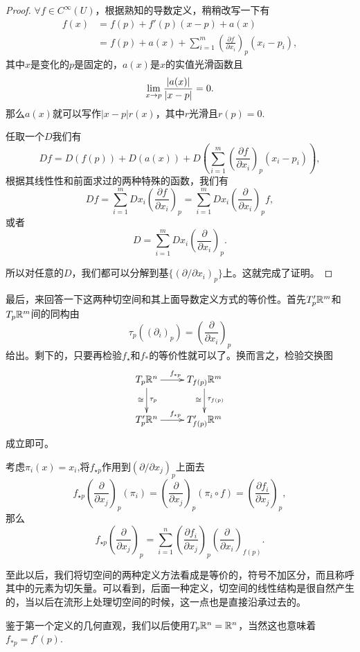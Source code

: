 \documentclass[11pt]{extbook}
\theoremstyle{plain}%
\begin{document}
\begin{proof}
	$\forall f\in C^\infty(U)$，根据熟知的导数定义，稍稍改写一下有
	\[
		\begin{split}
			f(x)&=f(p)+f'(p)(x-p)+a(x)\\
			&=f(p)+a(x)+\sum_{i=1}^m \left(\frac{\partial f}{\partial x_i}\right)_p(x_i-p_i),
		\end{split}
	\]
	其中$x$是变化的$p$是固定的，$a(x)$是$x$的实值光滑函数且
	\[
		\lim_{x\to p}\frac{\arrowvert a(x)\arrowvert }{\arrowvert x-p\arrowvert }=0.
	\]
	那么$a(x)$就可以写作$|x-p|r(x)$，其中$r$光滑且$r(p)=0$.

	任取一个$D$我们有
	\[
		Df=D\left(f(p)\right)+D\left(a(x)\right)+D\left(\sum_{i=1}^m \left(\frac{\partial f}{\partial x_i}\right)_p(x_i-p_i)\right),
	\]
	根据其线性性和前面求过的两种特殊的函数，我们有
	\[
		Df=\sum_{i=1}^m Dx_i\left(\frac{\partial f}{\partial x_i}\right)_p=\sum_{i=1}^m Dx_i\left(\frac{\partial }{\partial x_i}\right)_pf,
	\]
	或者
	\[
		D=\sum_{i=1}^m Dx_i\left(\frac{\partial }{\partial x_i}\right)_p.
	\]
	
	所以对任意的$D$，我们都可以分解到基$\{\left(\partial/\partial x_i\right)_p\}$上。这就完成了证明。
\end{proof}

最后，来回答一下这两种切空间和其上面导数定义方式的等价性。首先$T'_p\mathbb{R}^m$和$T_p\mathbb{R}^m$间的同构由
\[
	\tau_p\left((\partial_i)_p\right)=\left(\frac{\partial }{\partial x_i}\right)_p
\]
给出。剩下的，只要再检验$f_\star$和$f_*$的等价性就可以了。换而言之，检验交换图
\[
	\xymatrix{
	T_{p}\rr^n\ar[d]_\cong^{\tau_p}\ar[r]^{f_{*p}}&T_{f(p)}\rr^m\ar[d]_\cong^{\tau_{f(p)}}\\
	T'_{p}\rr^n\ar[r]^{f_{\star p}}&T'_{f(p)}\rr^m
	}
\]
成立即可。

考虑$\pi_i(x)=x_i$,将$f_{\star p}$作用到$\left(\partial/\partial x_j\right)_p$上面去
\[
	f_{\star p}\left(\frac{\partial}{\partial x_j}\right)_p(\pi_i)=\left(\frac{\partial}{\partial x_j}\right)_p(\pi_i\circ f)=\left(\frac{\partial f_i}{\partial x_j}\right)_p,
\]
那么
\[
	f_{\star p}\left(\frac{\partial}{\partial x_j}\right)_p=\sum_{i=1}^n\left(\frac{\partial f_i}{\partial x_j}\right)_p \left(\frac{\partial}{\partial x_i}\right)_{f(p)}.
\]

至此以后，我们将切空间的两种定义方法看成是等价的，符号不加区分，而且称呼其中的元素为切矢量。可以看到，后面一种定义，切空间的线性结构是很自然产生的，当以后在流形上处理切空间的时候，这一点也是直接沿承过去的。

鉴于第一个定义的几何直观，我们以后使用$T_p\mathbb{R}^n=\mathbb{R}^n$，当然这也意味着$f_{*p}=f'(p)$.
\end{document}
